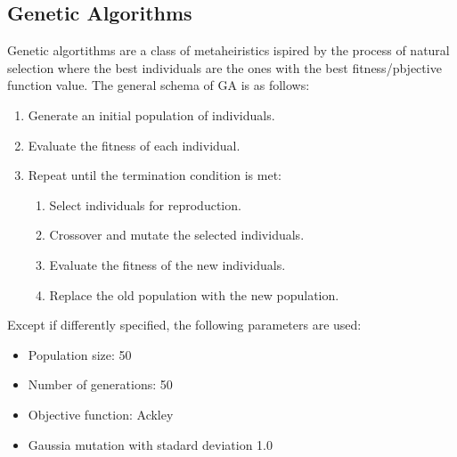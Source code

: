 \subsection{Genetic Algorithms}
Genetic algortithms are a class of metaheiristics ispired by the process of natural selection where the best individuals are the ones with the best fitness/pbjective function value. The general schema of GA is as follows:
\begin{enumerate}
    \item Generate an initial population of individuals.
    \item Evaluate the fitness of each individual.
    \item Repeat until the termination condition is met:
          \begin{enumerate}
              \item Select individuals for reproduction.
              \item Crossover and mutate the selected individuals.
              \item Evaluate the fitness of the new individuals.
              \item Replace the old population with the new population.
          \end{enumerate}
\end{enumerate}

Except if differently specified, the following parameters are used:
\begin{itemize}
    \item Population size: 50
    \item Number of generations: 50
    \item Objective function: Ackley
    \item Gaussia mutation with stadard deviation 1.0
\end{itemize}

